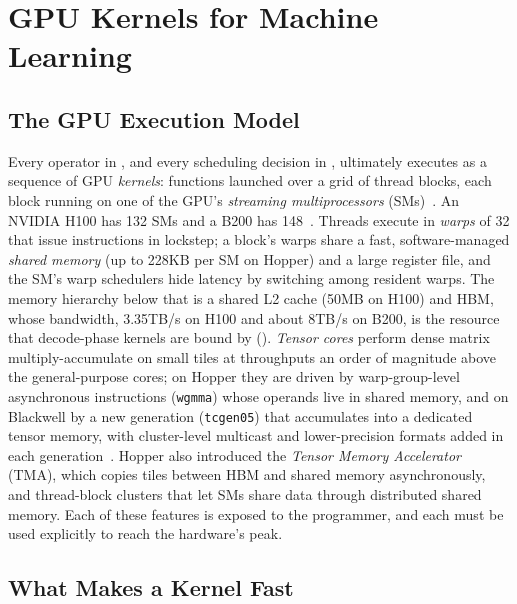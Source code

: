 \section{GPU Kernels for Machine Learning}
\label{background:sec:gpu}

\subsection{The GPU Execution Model}
\label{background:subsec:gpu_model}

Every operator in , and every scheduling decision in , ultimately executes as a sequence of GPU \emph{kernels}: functions launched over a grid of thread blocks, each block running on one of the GPU's \emph{streaming multiprocessors} (SMs)~\cite{nvidia2025cudaguide}.
An NVIDIA H100 has 132 SMs and a B200 has 148~\cite{nvidia2022hopper,nvidia2024blackwell}.
Threads execute in \emph{warps} of 32 that issue instructions in lockstep; a block's warps share a fast, software-managed \emph{shared memory} (up to 228KB per SM on Hopper) and a large register file, and the SM's warp schedulers hide latency by switching among resident warps.
The memory hierarchy below that is a shared L2 cache (50MB on H100) and HBM, whose bandwidth, 3.35TB/s on H100 and about 8TB/s on B200, is the resource that decode-phase kernels are bound by ().
\emph{Tensor cores} perform dense matrix multiply-accumulate on small tiles at throughputs an order of magnitude above the general-purpose cores; on Hopper they are driven by warp-group-level asynchronous instructions (\texttt{wgmma}) whose operands live in shared memory, and on Blackwell by a new generation (\texttt{tcgen05}) that accumulates into a dedicated tensor memory, with cluster-level multicast and lower-precision formats added in each generation~\cite{nvidia2022hopper,nvidia2024blackwell}.
Hopper also introduced the \emph{Tensor Memory Accelerator} (TMA), which copies tiles between HBM and shared memory asynchronously, and thread-block clusters that let SMs share data through distributed shared memory.
Each of these features is exposed to the programmer, and each must be used explicitly to reach the hardware's peak.

\subsection{What Makes a Kernel Fast}
\label{background:subsec:kernel_fast}

